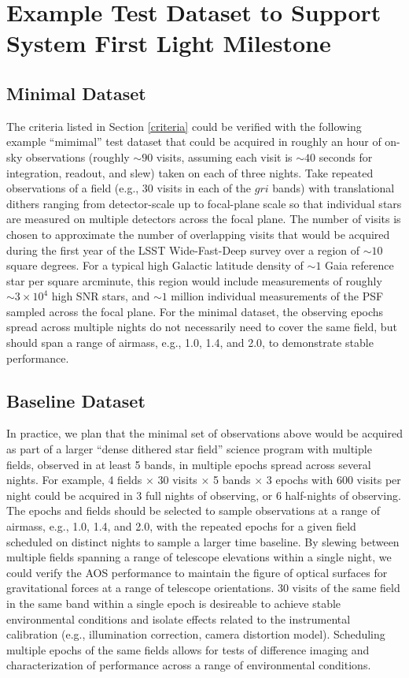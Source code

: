 \documentclass[SE,authoryear,toc,lsstdraft]{lsstdoc}
\begin{document}
\section{Example Test Dataset to Support System First Light Milestone}
\label{dataset}

\subsection{Minimal Dataset}

The criteria listed in Section \ref{criteria} could be verified with the following example ``mimimal'' test dataset that could be acquired in roughly an hour of on-sky observations (roughly $\sim90$ visits, assuming each visit is $\sim40$ seconds for integration, readout, and slew) taken on each of three nights.
Take repeated observations of a field (e.g., 30 visits in each of the $gri$ bands) with translational dithers ranging from detector-scale up to focal-plane scale so that individual stars are measured on multiple detectors across the focal plane.
The number of visits is chosen to approximate the number of overlapping visits that would be acquired during the first year of the LSST Wide-Fast-Deep survey over a region of $\sim10$ square degrees.
For a typical high Galactic latitude density of $\sim1$ Gaia reference star per square arcminute, this region would include measurements of roughly $\sim3 \times 10^4$ high SNR stars, and $\sim1$ million individual measurements of the PSF sampled across the focal plane.
For the minimal dataset, the observing epochs spread across multiple nights do not necessarily need to cover the same field, but should span a range of airmass, e.g., 1.0, 1.4, and 2.0, to demonstrate stable performance.

\subsection{Baseline Dataset}

In practice, we plan that the minimal set of observations above would be acquired as part of a larger ``dense dithered star field'' science program with multiple fields, observed in at least 5 bands, in multiple epochs spread across several nights.
For example, 4 fields $\times$ 30 visits $\times$ 5 bands $\times$ 3 epochs with 600 visits per night could be acquired in 3 full nights of observing, or 6 half-nights of observing.
The epochs and fields should be selected to sample observations at a range of airmass, e.g., 1.0, 1.4, and 2.0, with the repeated epochs for a given field scheduled on distinct nights to sample a larger time baseline.
By slewing between multiple fields spanning a range of telescope elevations within a single night, we could verify the AOS performance to maintain the figure of optical surfaces for gravitational forces at a range of telescope orientations.
30 visits of the same field in the same band within a single epoch is desireable to achieve stable environmental conditions and isolate effects related to the instrumental calibration (e.g., illumination correction, camera distortion model).
Scheduling multiple epochs of the same fields allows for tests of difference imaging and characterization of performance across a range of environmental conditions.
\end{document}
